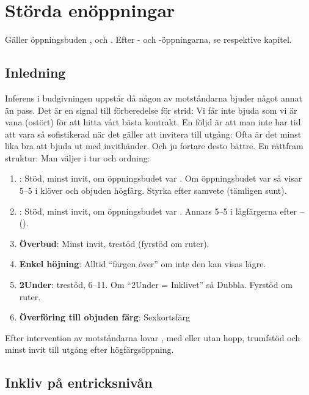 \chapter{Störda en{\"o}ppningar}

Gäller öppningsbuden ,  och . Efter - och
-öppningarna, se respektive kapitel.
 
\section{Inledning}

Inferens i budgivningen uppstår då någon av motståndarna bjuder något annat
än pass. Det är en signal till 
förberedelse för strid: Vi får inte bjuda som vi är vana (ostört) för att
hitta vårt bästa kontrakt. 
En följd är att man inte har tid att vara så sofistikerad när det gäller
att invitera till utgång: Ofta är det 
minst lika bra att bjuda ut med invithänder. Och ju fortare desto bättre.
En rättfram struktur: Man väljer i tur och ordning:
\begin{enumerate}
\item {}: Stöd, minst invit, om öppningsbudet var . Om
  öppningsbudet var  så visar  5--5 i klöver och objuden
  högfärg. Styrka efter samvete (tämligen sunt).
\item {}: Stöd, minst invit, om öppningsbudet var . Annars 5--5
  i lågfärgerna efter  --().  
\item {\bf Överbud}: Minst invit, trestöd (fyrstöd om ruter).
\item {\bf Enkel höjning}: Alltid “färgen över” om inte den kan visas lägre.
\item {\bf 2Under}: trestöd, 6–11. Om “2Under = Inklivet” så
  Dubbla. Fyrstöd om ruter. 
\item {\bf Överföring till objuden färg}: Sexkortsfärg
\end{enumerate}

Efter intervention av motståndarna lovar , med eller utan hopp,
trumf\-stöd och minst invit till utgång efter högfärgsöppning.


\section{Inkliv på entricksnivån}


